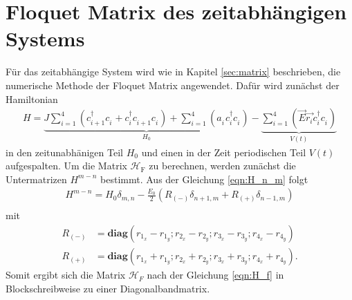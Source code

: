 \section{Floquet Matrix des zeitabhängigen Systems}
Für das zeitabhängige System wird wie
in Kapitel \ref{sec:matrix} beschrieben, die
numerische Methode der Floquet Matrix angewendet.
Dafür wird zunächst der Hamiltonian
\begin{align}
H=\underbrace{J\sum_{i=1}^4 \left(c_{i+1}^\dag c_i^{\phantom{\dag}} + c_{i}^\dag c_{i+1}^{\phantom{\dag}}c_i^{\phantom{\dag}}\right)
+ \sum_{i=1}^4\left(a_i^{\phantom{\dag}} c_i^\dag c_i^{\phantom{\dag}}\right)}_{H_0}
-\underbrace{\sum_{i=1}^4\left(\vec{E} \vec{r_i}  c_i^\dag c_i^{\phantom{\dag}}\right)}_{V(t)}
\end{align}
in den zeitunabhänigen Teil $H_0$ und einen in der Zeit periodischen Teil $V(t)$ aufgespalten.
Um die Matrix $\mathcal{H}_\mathrm{F}$ zu berechnen, werden zunächst die Untermatrizen $H^{m-n}$ bestimmt.
Aus der Gleichung \eqref{eqn:H_n_m} folgt
\begin{align}
  H^{m-n}=H_0\delta_{m,n} -\frac{E_0}{2}\left(R_{(-)} \delta_{n+1,m}   +  R_{(+)}\delta_{n-1,m}\right)\\
\end{align}
mit
\begin{align}
  R_{(-)}&=\textbf{diag}\left(
  r_{1_x}-r_{1_y} ;
  r_{2_x}-r_{2_y} ;
  r_{3_x}-r_{3_y} ;
  r_{4_x}-r_{4_y}\right)
\\
  R_{(+)}&= \textbf{diag}\left(
  r_{1_x}+r_{1_y} ;
  r_{2_x}+r_{2_y} ;
  r_{3_x}+r_{3_y} ;
  r_{4_x}+r_{4_y}\right).
\end{align}
Somit ergibt sich die Matrix $\mathcal{H}_F$ nach
der Gleichung \eqref{eqn:H_f} in
Blockschreibweise zu einer Diagonalbandmatrix.
